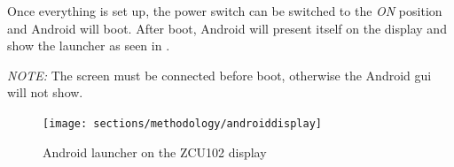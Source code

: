 Once everything is set up, the power switch can be switched to the \emph{ON}
position and Android will boot.
After boot, Android will present itself on the display and show the launcher
as seen in .


\emph{NOTE:} The screen must be connected before boot, otherwise the Android
\gls{gui} will not show.

\begin{figure}[htbp]
    \centering
    \texttt{[image: sections/methodology/androiddisplay]}
    \caption{\label{fig:androiddisplay} Android launcher on the ZCU102 display}
\end{figure}
